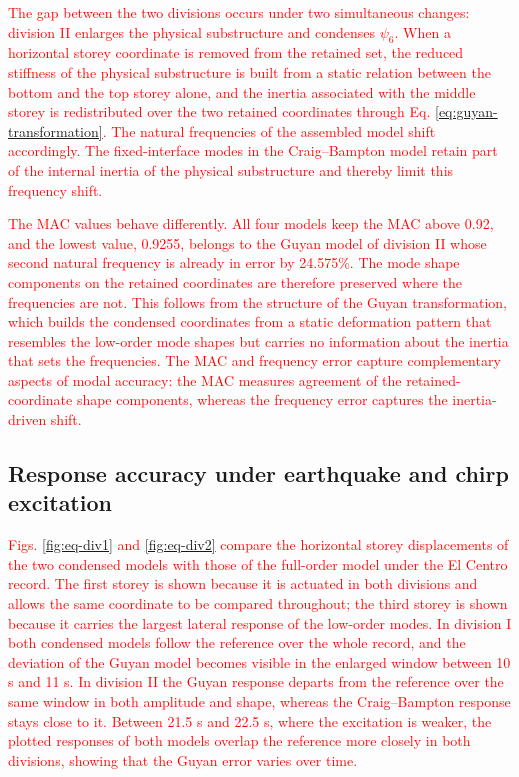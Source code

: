 \documentclass[11pt,a4paper]{article}
\numberwithin{equation}{section}
\newcommand{\rev}[1]{\textcolor{red}{#1}}
\begin{document}
\rev{The gap between the two divisions occurs under two simultaneous changes: division II enlarges the physical substructure and condenses \(\psi_{6}\). When a horizontal storey coordinate is removed from the retained set, the reduced stiffness of the physical substructure is built from a static relation between the bottom and the top storey alone, and the inertia associated with the middle storey is redistributed over the two retained coordinates through Eq. \eqref{eq:guyan-transformation}. The natural frequencies of the assembled model shift accordingly. The fixed-interface modes in the Craig--Bampton model retain part of the internal inertia of the physical substructure and thereby limit this frequency shift.}

\rev{The MAC values behave differently. All four models keep the MAC above 0.92, and the lowest value, 0.9255, belongs to the Guyan model of division II whose second natural frequency is already in error by 24.575\%. The mode shape components on the retained coordinates are therefore preserved where the frequencies are not. This follows from the structure of the Guyan transformation, which builds the condensed coordinates from a static deformation pattern that resembles the low-order mode shapes but carries no information about the inertia that sets the frequencies. The MAC and frequency error capture complementary aspects of modal accuracy: the MAC measures agreement of the retained-coordinate shape components, whereas the frequency error captures the inertia-driven shift.}

\subsection{Response accuracy under earthquake and chirp excitation}
\label{sec:response-accuracy}

\rev{Figs. \ref{fig:eq-div1} and \ref{fig:eq-div2} compare the horizontal storey displacements of the two condensed models with those of the full-order model under the El Centro record. The first storey is shown because it is actuated in both divisions and allows the same coordinate to be compared throughout; the third storey is shown because it carries the largest lateral response of the low-order modes. In division I both condensed models follow the reference over the whole record, and the deviation of the Guyan model becomes visible in the enlarged window between 10 s and 11 s. In division II the Guyan response departs from the reference over the same window in both amplitude and shape, whereas the Craig--Bampton response stays close to it. Between 21.5 s and 22.5 s, where the excitation is weaker, the plotted responses of both models overlap the reference more closely in both divisions, showing that the Guyan error varies over time.}
\end{document}
